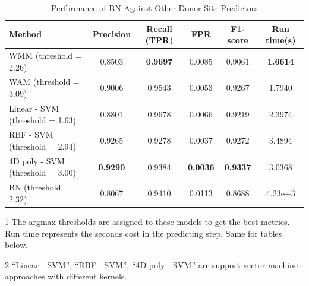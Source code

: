 \documentclass[journal,twoside]{IEEEtran}
\begin{document}
\begin{table}[htbp]
\begin{center}
\begin{threeparttable}
\caption{Performance of BN Against Other Donor Site Predictors}
\begin{tabular}{lccccc}
\toprule
Method & Precision & Recall (TPR) & FPR & F1-score & Run time(s) \\
\midrule
WMM (threshold = 2.26) & 0.8503 & \textbf{0.9697} & 0.0085 & 0.9061 & \textbf{1.6614} \\
WAM (threshold = 3.09) & 0.9006 & 0.9543 & 0.0053 & 0.9267 & 1.7940 \\
Linear - SVM\tnote{2} (threshold = 1.63) & 0.8801 & 0.9678 & 0.0066 & 0.9219 & 2.3974 \\
RBF - SVM\tnote{2} (threshold = 2.94) & 0.9265 & 0.9278 & 0.0037 & 0.9272 & 3.4894 \\
4D poly - SVM\tnote{2} (threshold = 3.00) & \textbf{0.9290} & 0.9384 & \textbf{0.0036} &  \textbf{0.9337} & 3.0368 \\
BN (threshold = 2.32) & 0.8067 & 0.9410 & 0.0113 & 0.8688 & 4.23e+3 \\
\bottomrule
\end{tabular}
\begin{tablenotes}
    \footnotesize
    \item[1] The argmax thresholds are assigned to these models to get the best metrics. Run time represents the seconds cost in the predicting step. Same for tables below. 
    \item[2] ``Linear - SVM'', ``RBF - SVM'', ``4D poly - SVM'' are support vector machine approaches with different kernels. 
\end{tablenotes}
\label{tab2}
\end{threeparttable}
\end{center}
\end{table}
\end{document}
